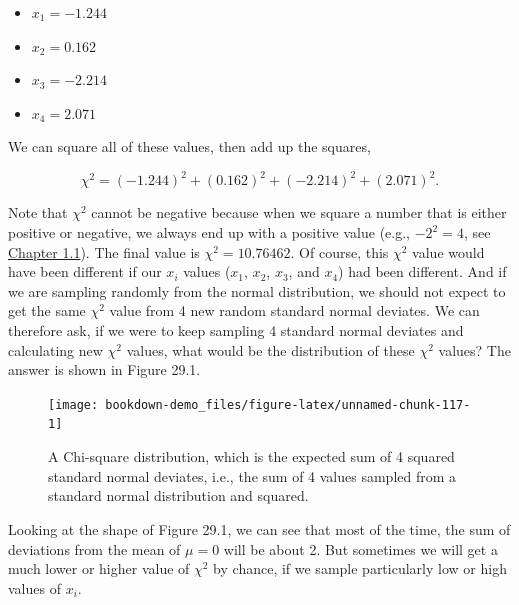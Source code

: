 \documentclass[
  openany]{krantz}
\providecommand{\tightlist}{%
  \setlength{\itemsep}{0pt}\setlength{\parskip}{0pt}}
\begin{document}
\begin{itemize}
\tightlist
\item
  \(x_{1} = -1.244\)
\item
  \(x_{2} = 0.162\)
\item
  \(x_{3} = -2.214\)
\item
  \(x_{4} = 2.071\)
\end{itemize}

We can square all of these values, then add up the squares,

\[\chi^{2} = (-1.244)^{2} + (0.162)^{2} + (-2.214)^{2} + (2.071)^{2}.\]

Note that \(\chi^{2}\) cannot be negative because when we square a number that is either positive or negative, we always end up with a positive value (e.g., \(-2^{2} = 4\), see \protect\hyperlink{numbers-and-operations}{Chapter 1.1}).
The final value is \(\chi^{2} = 10.76462\).
Of course, this \(\chi^{2}\) value would have been different if our \(x_{i}\) values (\(x_{1}\), \(x_{2}\), \(x_{3}\), and \(x_{4}\)) had been different.
And if we are sampling randomly from the normal distribution, we should not expect to get the same \(\chi^{2}\) value from 4 new random standard normal deviates.
We can therefore ask, if we were to keep sampling 4 standard normal deviates and calculating new \(\chi^{2}\) values, what would be the distribution of these \(\chi^{2}\) values?
The answer is shown in Figure 29.1.

\begin{figure}
\texttt{[image: bookdown-demo\_files/figure-latex/unnamed-chunk-117-1]} \caption{A Chi-square distribution, which is the expected sum of 4 squared standard normal deviates, i.e., the sum of 4 values sampled from a standard normal distribution and squared.}\label{fig:unnamed-chunk-117}
\end{figure}

Looking at the shape of Figure 29.1, we can see that most of the time, the sum of deviations from the mean of \(\mu = 0\) will be about 2.
But sometimes we will get a much lower or higher value of \(\chi^{2}\) by chance, if we sample particularly low or high values of \(x_{i}\).
\end{document}
